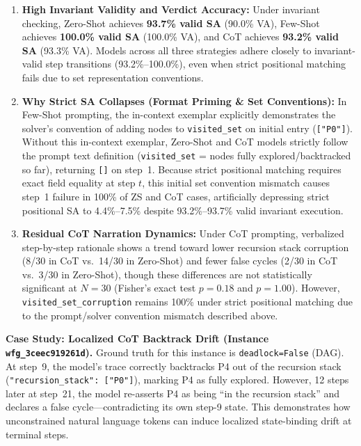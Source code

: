 \documentclass[conference]{IEEEtran}
\begin{document}
\begin{enumerate}
\item \textbf{High Invariant Validity and Verdict Accuracy:} Under invariant checking,
  Zero-Shot achieves \textbf{93.7\% valid SA} (90.0\% VA), Few-Shot achieves
  \textbf{100.0\% valid SA} (100.0\% VA), and CoT achieves \textbf{93.2\% valid SA}
  (93.3\% VA). Models across all three strategies adhere closely to invariant-valid
  step transitions (93.2\%--100.0\%), even when strict positional matching fails due
  to set representation conventions.

\item \textbf{Why Strict SA Collapses (Format Priming \& Set Conventions):} In Few-Shot
  prompting, the in-context exemplar explicitly demonstrates the solver's convention of
  adding nodes to \texttt{visited\_set} on initial entry (\texttt{["P0"]}). Without this
  in-context exemplar, Zero-Shot and CoT models strictly follow the prompt text definition
  (\texttt{visited\_set} = nodes fully explored/backtracked so far), returning \texttt{[]} on
  step~1. Because strict positional matching requires exact field equality at step $t$,
  this initial set convention mismatch causes step~1 failure in 100\% of ZS and CoT cases,
  artificially depressing strict positional SA to 4.4\%--7.5\% despite 93.2\%--93.7\% valid
  invariant execution.

\item \textbf{Residual CoT Narration Dynamics:} Under CoT prompting, verbalized step-by-step
  rationale shows a trend toward lower recursion stack corruption (8/30 in CoT vs.\ 14/30 in
  Zero-Shot) and fewer false cycles (2/30 in CoT vs.\ 3/30 in Zero-Shot), though these
  differences are not statistically significant at $N=30$ (Fisher's exact test $p = 0.18$
  and $p = 1.00$). However, \texttt{visited\_set\_corruption} remains 100\% under strict
  positional matching due to the prompt/solver convention mismatch described above.
\end{enumerate}

\textbf{Case Study: Localized CoT Backtrack Drift (Instance \texttt{wfg\_3ceec919261d}).}
Ground truth for this instance is \texttt{deadlock=False} (DAG). At step~9, the model's
trace correctly backtracks P4 out of the recursion stack
(\texttt{"recursion\_stack":~["P0"]}), marking P4 as fully explored. However, 12 steps
later at step~21, the model re-asserts P4 as being ``in the recursion stack'' and
declares a false cycle---contradicting its own step-9 state. This demonstrates how
unconstrained natural language tokens can induce localized state-binding drift at
terminal steps.
\end{document}
